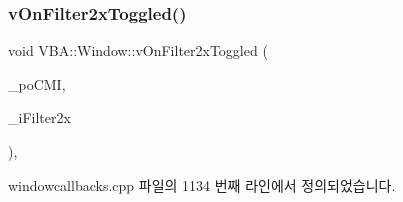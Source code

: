 \subsubsection{\texorpdfstring{v\+On\+Filter2x\+Toggled()}{vOnFilter2xToggled()}}
{\footnotesize\ttfamily void V\+B\+A\+::\+Window\+::v\+On\+Filter2x\+Toggled (\begin{DoxyParamCaption}\item[{Gtk\+::\+Check\+Menu\+Item $\ast$}]{\+\_\+po\+C\+MI,  }\item[{\mbox{\hyperlink{_util_8cpp_a0ef32aa8672df19503a49fab2d0c8071}{int}}}]{\+\_\+i\+Filter2x }\end{DoxyParamCaption})\hspace{0.3cm}{\ttfamily [protected]}, {\ttfamily [virtual]}}



windowcallbacks.\+cpp 파일의 1134 번째 라인에서 정의되었습니다.


